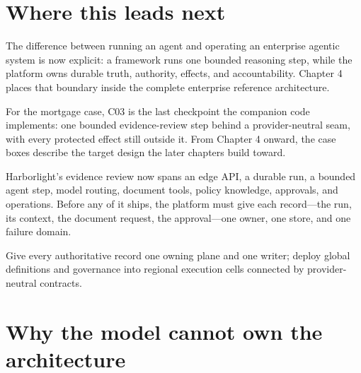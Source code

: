 \section{Where this leads next}

The difference between running an agent and operating an enterprise agentic system is now explicit: a framework runs one bounded reasoning step, while the platform owns durable truth, authority, effects, and accountability. Chapter 4 places that boundary inside the complete enterprise reference architecture.\par

For the mortgage case, C03 is the last checkpoint the companion code implements: one bounded evidence-review step behind a provider-neutral seam, with every protected effect still outside it. From Chapter 4 onward, the case boxes describe the target design the later chapters build toward.\par




\begin{bookcallout}
Harborlight's evidence review now spans an edge API, a durable run, a bounded agent step, model routing, document tools, policy knowledge, approvals, and operations. Before any of it ships, the platform must give each record—the run, its context, the document request, the approval—one owner, one store, and one failure domain.
\end{bookcallout}

\begin{bookcallout}
Give every authoritative record one owning plane and one writer; deploy global definitions and governance into regional execution cells connected by provider-neutral contracts.
\end{bookcallout}

\section{Why the model cannot own the architecture}

